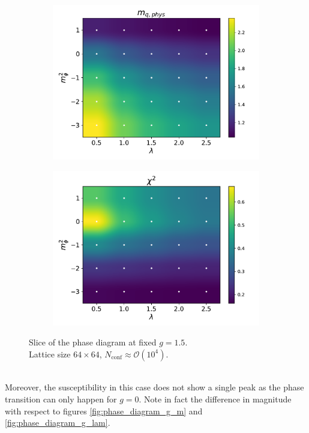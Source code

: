 \begin{figure}[hbp]
\begin{subfigure}[b]{0.47\textwidth}
    \end{subfigure}
    \begin{subfigure}[b]{0.47\textwidth}
        \includegraphics[width=\textwidth]{figures/phase_diagram/m-lam/phase_diagram_mqphys.pdf}
    \end{subfigure}
    \begin{subfigure}[b]{0.47\textwidth}
        \includegraphics[width=\textwidth]{figures/phase_diagram/m-lam/phase_diagram_chi2.pdf}
    \end{subfigure}
    \caption{Slice of the phase diagram at fixed $g = 1.5$. \\ Lattice size $64 \times 64$, $N_\text{conf} \approx \mathcal{O}(10^4)$.}
    \label{fig:phase_diagram_m_lam}
\end{figure}\\
Moreover, the susceptibility in this case does not show a single peak as the phase transition can only happen for $g=0$. Note in fact the difference in magnitude with respect to figures \ref{fig:phase_diagram_g_m} and \ref{fig:phase_diagram_g_lam}.

